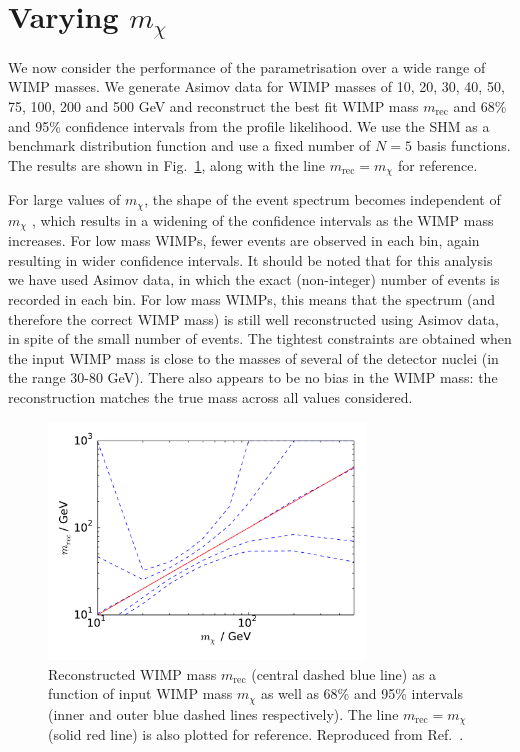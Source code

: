 \section{Varying $m_\chi$}
\label{sec:Poly:mass}

We now consider the performance of the parametrisation over a wide range of WIMP masses. We generate Asimov data for WIMP masses of 10, 20, 30, 40, 50, 75, 100, 200 and 500 GeV and reconstruct the best fit WIMP mass $m_\textrm{rec}$ and 68\% and 95\% confidence intervals from the profile likelihood. We use the SHM as a benchmark distribution function and use a fixed number of $N=5$ basis functions. The results are shown in Fig.~\ref{fig:Poly:VaryingM}, along with the line $m_\textrm{rec} = m_\chi$ for reference.

For large values of $m_\chi$, the shape of the event spectrum becomes independent of $m_\chi$ \cite{Green:2008}, which results in a widening of the confidence intervals as the WIMP mass increases. For low mass WIMPs, fewer events are observed in each bin, again resulting in wider confidence intervals. It should be noted that for this analysis we have used Asimov data, in which the exact (non-integer) number of events is recorded in each bin. For low mass WIMPs, this means that the spectrum (and therefore the correct WIMP mass) is still well reconstructed using Asimov data, in spite of the small number of events. The tightest constraints are obtained when the input WIMP mass is close to the masses of several of the detector nuclei (in the range 30-80 GeV). There also appears to be no bias in the WIMP mass: the reconstruction matches the true mass across all values considered.

\begin{figure}[t]
\centering
  \includegraphics[width=0.75\textwidth]{Poly/VaryingM.pdf}
  \caption[Reconstructed WIMP mass as a function of input WIMP mass for ideal experiments]{Reconstructed WIMP mass $m_\textrm{rec}$ (central dashed blue line) as a function of input WIMP mass $m_\chi$ as well as 68\% and 95\% intervals (inner and outer blue dashed lines respectively). The line $m_\textrm{rec} = m_\chi$ (solid red line) is also plotted for reference. Reproduced from Ref.~\cite{Kavanagh:2014}.}
  \label{fig:Poly:VaryingM}
\end{figure}


